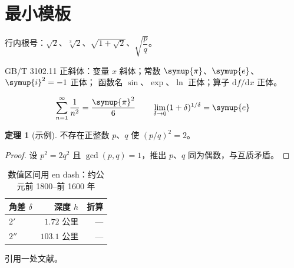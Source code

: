 \documentclass[11pt,a4paper]{ctexart}
\theoremstyle{definition}
\newtheorem{theorem}{定理}
\begin{document}
\section*{最小模板}

行内根号：$\sqrt{2}$、$\sqrt[3]{2}$、$\sqrt{1+\sqrt{2}}$、$\sqrt{\dfrac{p}{q}}$。

GB/T 3102.11 正斜体：变量 $x$ 斜体；常数 $\symup{\pi}$、$\symup{e}$、$\symup{i}^{2}=-1$ 正体；
函数名 $\sin$、$\exp$、$\ln$ 正体；算子 $\mathrm{d}f/\mathrm{d}x$ 正体。

$$\sum_{n=1}^{\infty}\frac{1}{n^{2}}=\frac{\symup{\pi}^{2}}{6}
\qquad
\lim_{\delta\to0}(1+\delta)^{1/\delta}=\symup{e}$$

\begin{theorem}[示例]
  不存在正整数 $p$、$q$ 使 $(p/q)^{2}=2$。
\end{theorem}
\begin{proof}
  设 $p^{2}=2q^{2}$ 且 $\gcd(p,q)=1$，推出 $p$、$q$ 同为偶数，与互质矛盾。
\end{proof}

\begin{table}[htbp]
  \centering
  \begin{tabular}{lrr}
    \toprule
    角差 $\delta$ & 深度 $h$ & 折算 \\
    \midrule
    $2'$  & $1.72$ 公里  & --- \\
    $2''$ & $103.1$ 公里 & --- \\
    \bottomrule
  \end{tabular}
  \caption{数值区间用 en dash：约公元前 1800--前 1600 年}
\end{table}

引用一处文献\cite{example2026}。

\printbibliography
\end{document}
